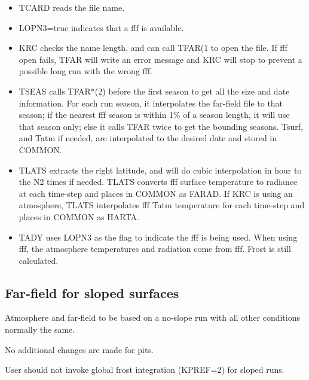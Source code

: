 \begin{itemize}      %

\item TCARD reads the file name. 

\item LOPN3=true indicates that a fff is available.

\item KRC checks the name length, and can call TFAR(1 to open the file.  If fff
  open fails, TFAR will write an error message and KRC will stop to prevent a
  possible long run with the wrong fff.

\item TSEAS calls TFAR*(2) before the first season to get all the size and date
  information. For each run season, it interpolates the far-field file to that
  season; if the nearest fff season is within 1\% of a season length, it will
  use that season only; else it calls TFAR twice to get the bounding
  seasons. Tsurf, and Tatm if needed, are interpolated to the desired date and
  stored in COMMON.

\item TLATS extracts the right latitude, and will do cubic interpolation in hour
  to the N2 times if needed. TLATS converts fff surface temperature to radiance at each
  time-step and places in COMMON as FARAD. If KRC is using an atmosphere, TLATS
  interpolates fff Tatm temperature for each time-step and places in COMMON as
  HARTA.

\item TADY uses LOPN3 as the flag to indicate the fff is being used. When using
  fff, the atmosphere temperatures and radiation come from fff.  Frost is still
  calculated.

 \end{itemize}

\subsection{Far-field for sloped surfaces } %

Atmosphere and far-field to be based on a no-slope run with all other conditions
normally the same.

No additional changes are made for pits. 

User should not invoke global frost integration (KPREF=2) for sloped runs.

\vspace{3 mm}

